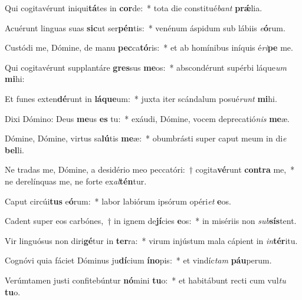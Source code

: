 \item Qui cogitavérunt iniqui\textbf{tá}tes in \textbf{cor}de:~* tota die constitué\textit{bant} \textbf{prǽ}lia.
\item Acuérunt linguas suas \textbf{sic}ut ser\textbf{pén}tis:~* venénum áspidum sub lábiis \textit{e}\textbf{ó}rum.
\item Custódi me, Dómine, de manu \textbf{pec}ca\textbf{tó}ris:~* et ab homínibus iníquis é\textit{ri}\textbf{pe} me.
\item Qui cogitavérunt supplantáre \textbf{gres}sus \textbf{me}os:~* abscondérunt supérbi láque\textit{um} \textbf{mi}hi:
\item Et funes exten\textbf{dé}runt in \textbf{lá}\textbf{que}um:~* juxta iter scándalum posué\textit{runt} \textbf{mi}hi.
\item Dixi Dómino: Deus \textbf{me}us \textbf{es} tu:~* exáudi, Dómine, vocem deprecatió\textit{nis} \textbf{me}æ.
\item Dómine, Dómine, virtus sa\textbf{lú}tis \textbf{me}æ:~* obumbrásti super caput meum in di\textit{e} \textbf{bel}li.
\item Ne tradas me, Dómine, a desidério meo peccatóri:~† cogita\textbf{vé}runt \textbf{con}\textbf{tra} me,~* ne derelínquas me, ne forte ex\textit{al}\textbf{tén}tur.
\item Caput circúi\textbf{tus} e\textbf{ó}rum:~* labor labiórum ipsórum opéri\textit{et} \textbf{e}os.
\item Cadent super eos carbónes,~† in ignem de\textbf{jí}cies \textbf{e}os:~* in misériis non \textit{sub}\textbf{sís}tent.
\item Vir linguósus non diri\textbf{gé}tur in \textbf{ter}ra:~* virum injústum mala cápient in \textit{in}\textbf{tér}itu.
\item Cognóvi quia fáciet Dóminus ju\textbf{dí}cium \textbf{ín}\textbf{o}pis:~* et vindíc\textit{tam} \textbf{páu}perum.
\item Verúmtamen justi confitebúntur \textbf{nó}mini \textbf{tu}o:~* et habitábunt recti cum vul\textit{tu} \textbf{tu}o.
